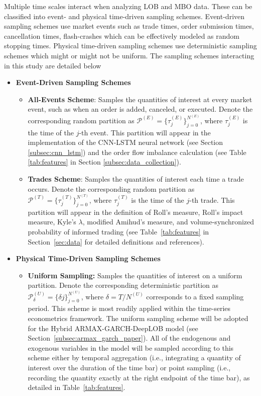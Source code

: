 \documentclass{rQUF2e}
\theoremstyle{plain}
\theoremstyle{definition}
\theoremstyle{remark}
\begin{document}
Multiple time scales interact when analyzing LOB and MBO data. These can be classified into event- and physical time-driven sampling schemes. Event-driven sampling schemes use market events such as trade times, order submission times, cancellation times, flash-crashes which can be effectively modeled as random stopping times. Physical time-driven sampling schemes use deterministic sampling schemes which might or might not be uniform. The sampling schemes interacting in this study are detailed below

\begin{itemize}
    \item \textbf{Event-Driven Sampling Schemes}
          \begin{itemize}
              \item \textbf{All-Events Scheme}: Samples the quantities of interest at every market event, such as when an order is added, canceled, or executed. Denote the corresponding random partition as $\mathcal{P}^{(E)} = \{\tau^{(E)}_j\}_{j=0}^{N^{(E)}}$, where $\tau^{(E)}_j$ is the time of the $j$-th event. This partition will appear in the implementation of the CNN-LSTM neural network (see Section \ref{subsec:cnn_lstm}) and the order flow imbalance calculation (see Table \ref{tab:features} in Section \ref{subsec:data_collection}).
              \item \textbf{Trades Scheme}: Samples the quantities of interest each time a trade occurs. Denote the corresponding random partition as $\mathcal{P}^{(T)} = \{\tau^{(T)}_j\}_{j=0}^{N^{(T)}}$, where $\tau^{(T)}_j$ is the time of the $j$-th trade. This partition will appear in the definition of Roll's measure, Roll's impact measure, Kyle's $\lambda$, modified Amihud's measure, and volume-synchronized probability of informed trading (see Table~\ref{tab:features} in Section~\ref{sec:data} for detailed definitions and references).
          \end{itemize}
    \item \textbf{Physical Time-Driven Sampling Schemes}
        \begin{itemize}
            \item \textbf{Uniform Sampling:} Samples the quantities of interest on a uniform partition. Denote the corresponding deterministic partition as $\mathcal{P}^{(U)}_{\delta} = \{\delta j\}_{j=0}^{N^{(U)}}$, where $\delta = T / N^{(U)}$ corresponds to a fixed sampling period. This scheme is most readily applied within the time-series econometrics framework. The uniform sampling scheme will be adopted for the Hybrid ARMAX-GARCH-DeepLOB model (see Section~\ref{subsec:armax_garch_paper}). All of the endogenous and exogenous variables in the model will be sampled according to this scheme either by temporal aggregation (i.e., integrating a quantity of interest over the duration of the time bar) or point sampling (i.e., recording the quantity exactly at the right endpoint of the time bar), as detailed in Table~\ref{tab:features}.
        \end{itemize}
\end{itemize}
\end{document}
